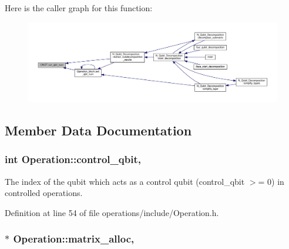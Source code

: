 Here is the caller graph for this function\+:
\nopagebreak
\begin{figure}[H]
\begin{center}
\leavevmode
\includegraphics[width=350pt]{class_c_n_o_t_a8272bf6e7ce6705a87d1ae9ef1e09418_icgraph}
\end{center}
\end{figure}




\subsection{Member Data Documentation}
\subsubsection[{\texorpdfstring{control\+\_\+qbit}{control_qbit}}]{\setlength{\rightskip}{0pt plus 5cm}int Operation\+::control\+\_\+qbit\hspace{0.3cm}{\ttfamily [protected]}, {\ttfamily [inherited]}}\hypertarget{class_operation_a9a798ea8adec5a45fd2ca07996da88e1}{}\label{class_operation_a9a798ea8adec5a45fd2ca07996da88e1}


The index of the qubit which acts as a control qubit (control\+\_\+qbit $>$= 0) in controlled operations. 



Definition at line 54 of file operations/include/\+Operation.\+h.

\subsubsection[{\texorpdfstring{matrix\+\_\+alloc}{matrix_alloc}}]{ $\ast$ Operation\+::matrix\+\_\+alloc\hspace{0.3cm}{\ttfamily [protected]}, {\ttfamily [inherited]}}\hypertarget{class_operation_ade4d28d271ca13950d04363aac1c382e}{}\label{class_operation_ade4d28d271ca13950d04363aac1c382e}


